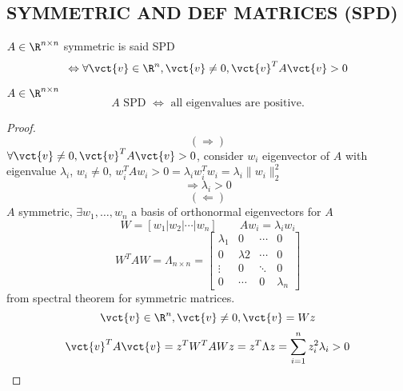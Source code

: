 \subsection*{SYMMETRIC AND DEF MATRICES (SPD)}
\begin{definition}
  $A \in \R^{n\times n}$ symmetric is said SPD
    $$\Leftrightarrow \forall \vct{v}\in \R^n, \vct{v}\neq 0, \vct{v}^TA\vct{v}>0$$
\end{definition}
\begin{theorem}
  $A\in \R^{n\times n}$
    $$A \text{ SPD } \Leftrightarrow \text{ all eigenvalues are positive.}$$
\end{theorem}
\begin{proof}
  $$(\Rightarrow)$$
  $\forall \vct{v}\neq 0, \vct{v}^TA\vct{v}>0$, consider $w_i$ eigenvector of $A$ with eigenvalue $\lambda_i$, $w_i\neq 0$, $w_i^TAw_i>0=\lambda_iw_i^Tw_i=\lambda_i \| w_i \|_{2} ^2$
    $$\Rightarrow \lambda_i>0$$
  $$(\Leftarrow)$$
  $A$ symmetric, $\exists w_1,\dots,w_n$ a basis of orthonormal eigenvectors for $A$
    $$W=[w_1 | w_2 | \cdots | w_n] \qquad Aw_i=\lambda_iw_i$$
    $$W^TAW=\Lambda_{n\times n}=
\begin{bmatrix}
  \lambda_1 & 0 & \cdots & 0 \\
  0 & \lambda 2 & \cdots & 0 \\
  \vdots & 0 & \ddots & 0 \\
  0 & \cdots & 0 & \lambda_n
\end{bmatrix}
    $$
    from spectral theorem for symmetric matrices.
    $$\vct{v}\in \R^n,\vct{v}\neq 0, \vct{v}=Wz$$
    $$\vct{v}^TA\vct{v}=z^TW^TAWz=z^T\Lambda z=\sum_{i=1}^nz_i^2\lambda_i >0$$
\end{proof}

